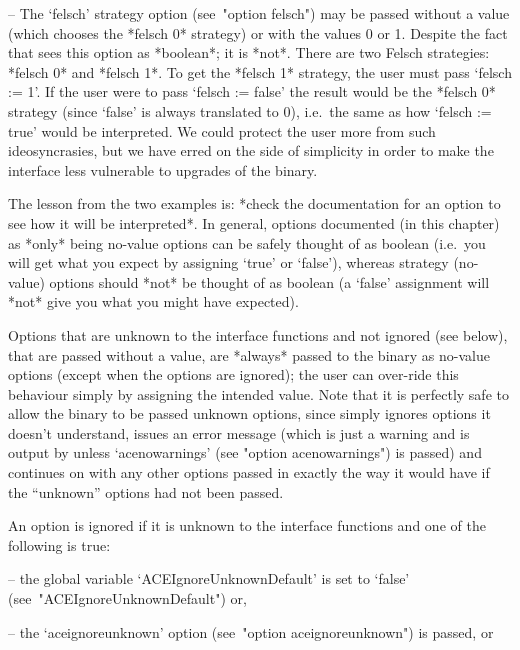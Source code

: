 \item{--} The `felsch' strategy option (see~"option  felsch")  may  be
passed without a value (which chooses the *felsch 0* strategy) or with
the values 0 or 1. Despite the fact that {\GAP} sees  this  option  as
*boolean*; it is *not*. There are two Felsch  strategies:  *felsch  0*
and *felsch 1*. To get the *felsch 1* strategy,  the  user  must  pass
`felsch := 1'. If the user were to pass `felsch := false'  the  result
would be the *felsch 0* strategy (since `false' is  always  translated
to 0), i.e.~the same as how `felsch := true' would be interpreted.  We
could protect the user more from  such  ideosyncrasies,  but  we  have
erred on the side of simplicity in order to make  the  interface  less
vulnerable to upgrades of the {\ACE} binary.

\endlist

The lesson from the two examples is: *check the documentation  for  an
option to see  how  it  will  be  interpreted*.  In  general,  options
documented (in this chapter) as *only* being no-value options  can  be
safely thought of as boolean (i.e.~you will get  what  you  expect  by
assigning `true' or  `false'),  whereas  strategy  (no-value)  options
should *not* be thought of as boolean (a `false' assignment will *not*
give you what you might have expected).

Options that are unknown to the {\ACE}  interface  functions  and  not
ignored (see below), that are passed without  a  value,  are  *always*
passed to the {\ACE} binary  as  no-value  options  (except  when  the
options are ignored); the user can over-ride this behaviour simply  by
assigning the intended value. Note that it is perfectly safe to  allow
the {\ACE} binary to be passed unknown options,  since  {\ACE}  simply
ignores options it doesn't understand, issues an error message  (which
is just a warning and is output by {\GAP} unless `acenowarnings'  (see
"option acenowarnings") is passed) and continues  on  with  any  other
options passed in exactly the way it would  have  if  the  ``unknown''
options had not been passed.

An option is  ignored  if  it  is  unknown  to  the  {\ACE}  interface
functions and one of the following is true:

\beginlist%
\item{--} the global  variable  `ACEIgnoreUnknownDefault'  is  set  to
`false' (see~"ACEIgnoreUnknownDefault") or,

\item{--} the `aceignoreunknown' option (see~"option aceignoreunknown")
is passed, or 

